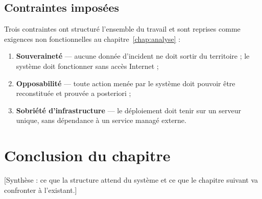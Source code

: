 \subsection{Contraintes impos\'ees}
Trois contraintes ont structur\'e l'ensemble du travail et sont reprises comme
exigences non fonctionnelles au chapitre~\ref{chap:analyse} :

\begin{enumerate}
  \item \textbf{Souverainet\'e} --- aucune donn\'ee d'incident ne doit sortir du
        territoire ; le syst\`eme doit fonctionner sans acc\`es Internet ;
  \item \textbf{Opposabilit\'e} --- toute action men\'ee par le syst\`eme doit pouvoir
        \^etre reconstitu\'ee et prouv\'ee a posteriori ;
  \item \textbf{Sobri\'et\'e d'infrastructure} --- le d\'eploiement doit tenir sur un
        serveur unique, sans d\'ependance \`a un service manag\'e externe.
\end{enumerate}

\section{Conclusion du chapitre}
[Synth\`ese : ce que la structure attend du syst\`eme et ce que le chapitre suivant
va confronter \`a l'existant.]
